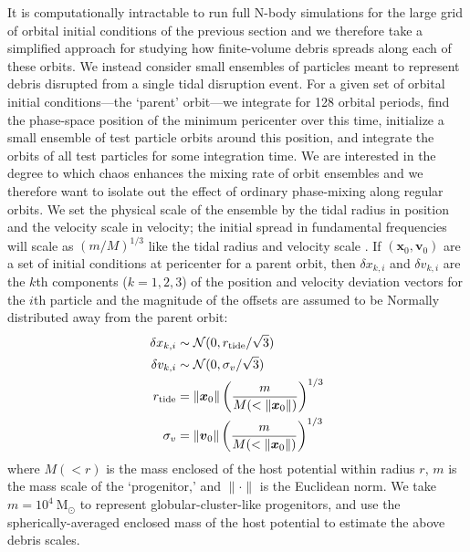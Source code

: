 \documentclass{mn2e}
\newcommand{\msun}{\ensuremath{\mathrm{M}_\odot}}
\newcommand{\bs}[1]{\boldsymbol{#1}}
\begin{document}
It is computationally intractable to run full N-body simulations for the large grid of orbital initial conditions of the previous section and we therefore take a simplified approach for studying how finite-volume debris spreads along each of these orbits. We instead consider small ensembles of particles meant to represent debris disrupted from a single tidal disruption event. For a given set of orbital initial conditions---the `parent' orbit---we integrate for 128 orbital periods, find the phase-space position of the minimum pericenter over this time, initialize a small ensemble of test particle orbits around this position, and integrate the orbits of all test particles for some integration time. We are interested in the degree to which chaos enhances the mixing rate of orbit ensembles and we therefore want to isolate out the effect of ordinary phase-mixing along regular orbits. We set the physical scale of the ensemble by the tidal radius in position and the velocity scale in velocity; the initial spread in fundamental frequencies will scale as $(m/M)^{1/3}$ like the tidal radius and velocity scale \citep[e.g.,][]{johnston98, apw14}. If $(\bs{x}_0,\bs{v}_0)$ are a set of initial conditions at pericenter for a parent orbit, then $\delta x_{k,i}$ and $\delta v_{k,i}$ are the $k$th components ($k=1,2,3$) of the position and velocity deviation vectors for the $i$th particle and the magnitude of the offsets are assumed to be Normally distributed away from the parent orbit:
\begin{align}
	\delta x_{k,i} &\sim \mathcal{N}(0, r_{\rm tide}/\sqrt{3})\\
	\delta v_{k,i} &\sim \mathcal{N}(0, \sigma_v/\sqrt{3})\\
	r_{\rm tide} &= \|\bs{x}_0\| \left(\frac{m}{M(<\|\bs{x}_0\|)}\right)^{1/3} \\
	\sigma_v &= \|\bs{v}_0\|\left(\frac{m}{M(<\|\bs{x}_0\|)}\right)^{1/3}
\end{align}
where $M(<r)$ is the mass enclosed of the host potential within radius $r$, $m$ is the mass scale of the `progenitor,' and $\|\cdot \|$ is the Euclidean norm. We take $m=10^4~\msun$ to represent globular-cluster-like progenitors, and use the spherically-averaged enclosed mass of the host potential to estimate the above debris scales. %
\end{document}
